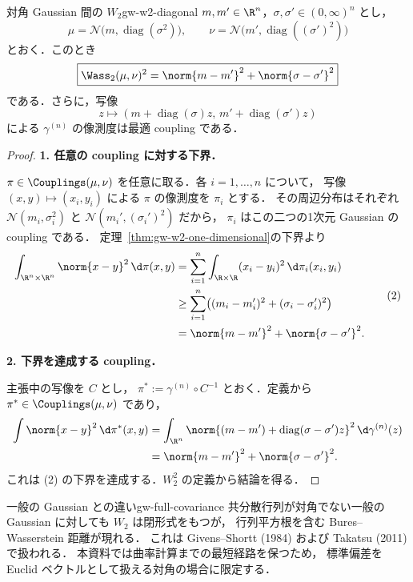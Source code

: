 \begin{theorem}{対角 Gaussian 間の $W_2$}{gw-w2-diagonal}
  $m,m'\in\R^n$，$\sigma,\sigma'\in(0,\infty)^n$ とし，
  \[
    \mu=\mathcal{N}\bigl(m,\operatorname{diag}(\sigma^2)\bigr),
    \qquad
    \nu=\mathcal{N}\bigl(m',\operatorname{diag}((\sigma')^2)\bigr)
  \]
  とおく．このとき
  \[
    \boxed{
      \Wass_2(\mu,\nu)^2
      =\norm{m-m'}^2+\norm{\sigma-\sigma'}^2
    }
  \]
  である．さらに，写像
  \[
    z\longmapsto
    \left(m+\operatorname{diag}(\sigma)z,\,
          m'+\operatorname{diag}(\sigma')z\right)
  \]
  による $\gamma^{(n)}$ の像測度は最適 coupling である．
\end{theorem}

\begin{proof}
  \textbf{1. 任意の coupling に対する下界．}

  $\pi\in\Couplings(\mu,\nu)$ を任意に取る．各 $i=1,\dots,n$ について，
  写像 $(x,y)\mapsto(x_i,y_i)$ による $\pi$ の像測度を $\pi_i$ とする．
  その周辺分布はそれぞれ
  $\mathcal{N}(m_i,\sigma_i^2)$ と
  $\mathcal{N}(m_i',(\sigma_i')^2)$ だから，
  $\pi_i$ はこの二つの1次元 Gaussian の coupling である．
  定理~\ref{thm:gw-w2-one-dimensional}の下界より
  \[
    \begin{aligned}
      \int_{\R^n\times\R^n}\norm{x-y}^2\,\d\pi(x,y)
      &=\sum_{i=1}^n\int_{\R\times\R}(x_i-y_i)^2\,\d\pi_i(x_i,y_i)\\
      &\geq\sum_{i=1}^n
        \bigl((m_i-m_i')^2+(\sigma_i-\sigma_i')^2\bigr)\\
      &=\norm{m-m'}^2+\norm{\sigma-\sigma'}^2.
    \end{aligned}                                      \tag{2}
  \]

  \textbf{2. 下界を達成する coupling．}

  主張中の写像を $C$ とし，
  $\pi^*:=\gamma^{(n)}\circ C^{-1}$ とおく．定義から
  $\pi^*\in\Couplings(\mu,\nu)$ であり，
  \[
    \begin{aligned}
      \int\norm{x-y}^2\,\d\pi^*(x,y)
      &=\int_{\R^n}
        \norm{(m-m')+\operatorname{diag}(\sigma-\sigma')z}^2
        \,\d\gamma^{(n)}(z)\\
      &=\norm{m-m'}^2+\norm{\sigma-\sigma'}^2.
    \end{aligned}
  \]
  これは (2) の下界を達成する．$W_2^2$ の定義から結論を得る．
\end{proof}

\begin{remark}{一般の Gaussian との違い}{gw-full-covariance}
  共分散行列が対角でない一般の Gaussian に対しても $W_2$ は閉形式をもつが，
  行列平方根を含む Bures--Wasserstein 距離が現れる．
  これは Givens--Shortt (1984) および Takatsu (2011) で扱われる．
  本資料では曲率計算までの最短経路を保つため，
  標準偏差を Euclid ベクトルとして扱える対角の場合に限定する．
\end{remark}

